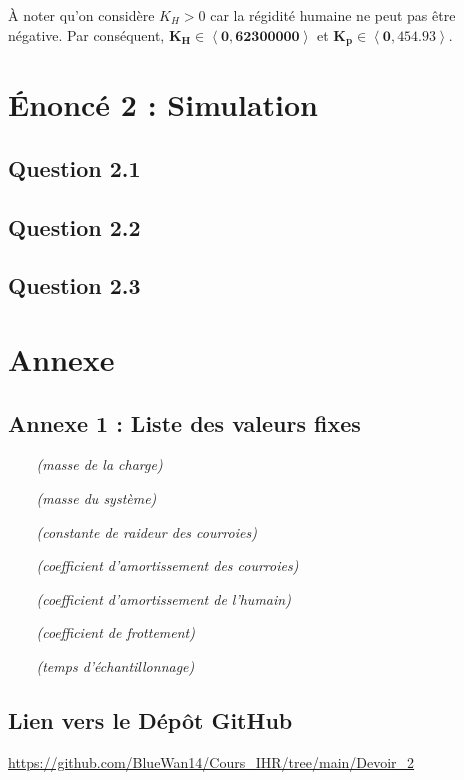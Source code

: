 \documentclass[a4paper,12pt]{article}
\begin{document}
    À noter qu'on considère $K_H > 0$ car la régidité humaine ne peut pas être négative. Par conséquent, $\mathbf{K_H \in \left< 0, 62300000 \right>}$ et $\mathbf{K_p \in \left< 0, 454.93 \right>}$.

    
    
    \newpage
    \section{Énoncé 2 : Simulation}
    \subsection{Question 2.1}
    
    \subsection{Question 2.2}
    
    \subsection{Question 2.3}
    
    
    
    \newpage
    \section{Annexe}
    \subsection{Annexe 1 : Liste des valeurs fixes}
    \begin{itemize}
        \item[$$]  \textit{(masse de la charge)}
        \item[$$]  \textit{(masse du système)}
        \item[$$]  \textit{(constante de raideur des courroies)}
        \item[$$]  \textit{(coefficient d'amortissement des courroies)}
        \item[$$]  \textit{(coefficient d'amortissement de l'humain)}
        \item[$$]  \textit{(coefficient de frottement)}
        \item[$$]  \textit{(temps d'échantillonnage)}
    \end{itemize}
    
    
    \subsection{Lien vers le Dépôt GitHub}
    \url{https://github.com/BlueWan14/Cours_IHR/tree/main/Devoir_2}
    
\end{document}
